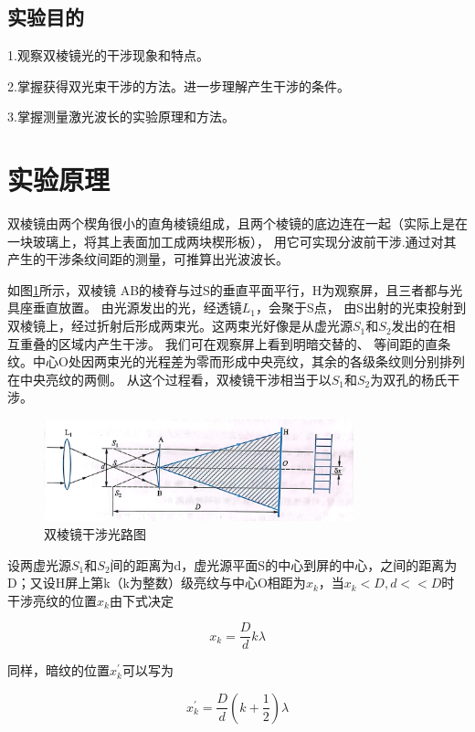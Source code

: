 \documentclass{ctexart}
\begin{document}
  \subsection{实验目的}
  1.\quad 观察双棱镜光的干涉现象和特点。

  2.\quad 掌握获得双光束干涉的方法。进一步理解产生干涉的条件。
  
  3.\quad 掌握测量激光波长的实验原理和方法。

\section{实验原理}
双棱镜由两个楔角很小的直角棱镜组成，且两个棱镜的底边连在一起（实际上是在一块玻璃上，将其上表面加工成两块楔形板），
用它可实现分波前干涉.通过对其产生的干涉条纹间距的测量，可推算出光波波长。

如图\ref{guanglu}所示，双棱镜 AB的棱脊与过S的垂直平面平行，H为观察屏，且三者都与光具座垂直放置。
由光源发出的光，经透镜$L_{1}$，会聚于S点，
由S出射的光束投射到双棱镜上，经过折射后形成两束光。这两束光好像是从虚光源$S_{1}$和$S_{2}$发出的在相互重叠的区域内产生干涉。
我们可在观察屏上看到明暗交替的、
等间距的直条纹。中心O处因两束光的光程差为零而形成中央亮纹，其余的各级条纹则分别排列在中央亮纹的两侧。
从这个过程看，双棱镜干涉相当于以$S_{1}$和$S_{2}$为双孔的杨氏干涉。

\begin{figure}[H]
  \centering
  \includegraphics[height=0.5\textheight,width=0.8\textwidth]{guanglu.jpg}
  \caption{双棱镜干涉光路图}\label{guanglu}
\end{figure}

设两虚光源$S_{1}$和$S_{2}$间的距离为d，虚光源平面S的中心到屏的中心，之间的距离为D；又设H屏上第k（k为整数）级亮纹与中心O相距为$x_{k}$，当$x_{k}<D,d<<D$时
干涉亮纹的位置$x_{k}$由下式决定

\begin{equation}
  x_{k}=\frac{D}{d} k \lambda
\end{equation}

同样，暗纹的位置$x_{k}^{'}$可以写为

\begin{equation}
  x_{k}^{'}=\frac{D}{d} (k+\frac{1}{2}) \lambda
\end{equation}
\end{document}

